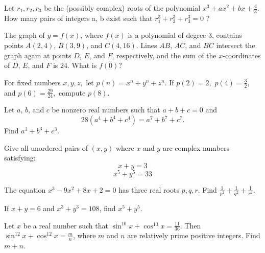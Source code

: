 \documentclass{article}
\begin{document}
\begin{prob}[BMT 2019]{4}

Let $r_1, r_2, r_3$ be the (possibly complex) roots of the polynomial $x^3 + ax^2 + bx + \frac{4}{3}$. How many
pairs of integers a, b exist such that $r_{1}^3 + r_{2}^3 + r_{3}^3 = 0$ ?
\end{prob}

\begin{req}[AMC 12B 2017/23]{4}
The graph of $y=f(x)$, where $f(x)$ is a polynomial of degree $3$, contains points $A(2,4)$, $B(3,9)$, and $C(4,16)$. Lines $AB$, $AC$, and $BC$ intersect the graph again at points $D$, $E$, and $F$, respectively, and the sum of the $x$-coordinates of $D$, $E$, and $F$ is $24$. What is $f(0)$?
\end{req}

\begin{prob}[FARML 2007/T9]{4}
For fixed numbers $x,y,z,$ let $p(n)=x^n+y^n+z^n.$ If $p(2)=2,$ $p(4)=\frac{3}{2},$ and $p(6)=\frac{29}{24},$ compute $p(8).$
\end{prob}

\begin{prob}{4}
Let $a$, $b$, and $c$ be nonzero real numbers such that $a+b+c=0$ and \[28(a^4+b^4+c^4) = a^7+b^7+c^7.\] Find $a^3+b^3+c^3$.
\end{prob}

\begin{prob}[]{4}
Give all unordered pairs of $(x,y)$ where $x$ and $y$ are complex numbers satisfying:
$$x+y=3$$
$$x^5+y^5=33$$
\end{prob}

\begin{req}[HMMT 2008]{4}
The equation $x^3-9x^2+8x+2=0$ has three real roots $p,q,r.$ Find $\frac{1}{p^2}+\frac{1}{q^2}+\frac{1}{r^2}.$
\end{req}



\begin{prob}{4}
If $x + y = 6$ and $x^3 + y^3 = 108$, find $x^5 + y^5$.
\end{prob}

\begin{prob}[2019 AIME I]{4}
Let $x$ be a real number such that $\sin^{10} x + \cos^{10}x=\frac{11}{36}$. Then $\sin^{12}x+\cos^{12}x=\frac{m}{n}$, where $m$ and $n$ are relatively prime positive integers. Find $m+n$.
\end{prob}
\end{document}
